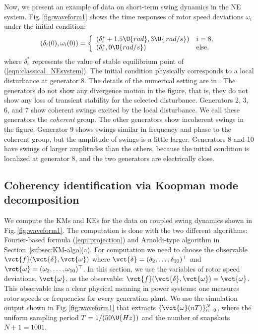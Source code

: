 \documentclass[a4paper,10pt]{article}
\begin{document}
%
Now, we present an example of data on short-term swing dynamics in the NE system.  
Fig.\,\ref{fig:waveform1} shows the time responses of rotor speed deviations $\omega_i$ under the initial condition:
\begin{equation}
(\delta_i(0),\omega_i(0))=
\left\{
\begin{array}{ll}
(\delta^\ast_i+1.5\U{rad},3\U{\,rad/s}) & i=8,\\
(\delta^\ast_i,0\U{rad/s}) & \mathrm{else,}
\end{array}
\right.
\label{eqn:ic}
\end{equation}
where $\delta_i^\ast$ represents the value of stable equilibrium point of (\ref{eqn:classical_NEsystem}). 
The initial condition physically corresponds to a local disturbance at generator 8.  
The details of the numerical setting are in \cite{Susuki_IEEETPWRS26}.  
The generators do not show any divergence motion in the figure, that is, they do not show any loss of transient stability for the selected disturbance.  
Generators 2, 3, 6, and 7 show coherent swings excited by the local disturbance.  
We call these generators the \emph{coherent} group.  
The other generators show incoherent swings in the figure.  
Generator 9 shows swings similar in frequency and phase to the coherent group, but the amplitude of swings is a little larger.  
Generators 8 and 10 have swings of larger amplitudes than the others, because the initial condition is localized at generator 8, and the two generators are electrically close.  


\subsection{Coherency identification via Koopman mode decomposition}
\label{subsec:coherency-KMD}

We compute the KMs and KEs for the data on coupled swing dynamics shown in Fig.\,\ref{fig:waveform1}.  
The computation is done with the two different algorithms: Fourier-based formula (\ref{eqn:projection}) and Arnoldi-type algorithm in Section~\ref{subsec:KM-algo}(a).  
For computation we need to choose the observable $\vct{f}(\vct{\delta},\vct{\omega})$ where $\vct{\delta}=(\delta_2,\ldots,\delta_{10})^\top$ and $\vct{\omega}=(\omega_2,\ldots,\omega_{10})^\top$.  
In this section, we use the variables of rotor speed deviations, $\vct{\omega}$, as the observable:  $\vct{f}(\vct{\delta},\vct{\omega})=\vct{\omega}$.  
This observable has a clear physical meaning in power systems:  one measures rotor speeds or frequencies for every generation plant.  
We use the simulation output shown in Fig.\,\ref{fig:waveform1} that extracts $\{\vct{\omega}(nT)\}_{n=0}^{N}$, where the uniform sampling period $T=1/(50\U{Hz})$ and the number of snapshots $N+1=1001$. 
\end{document}
